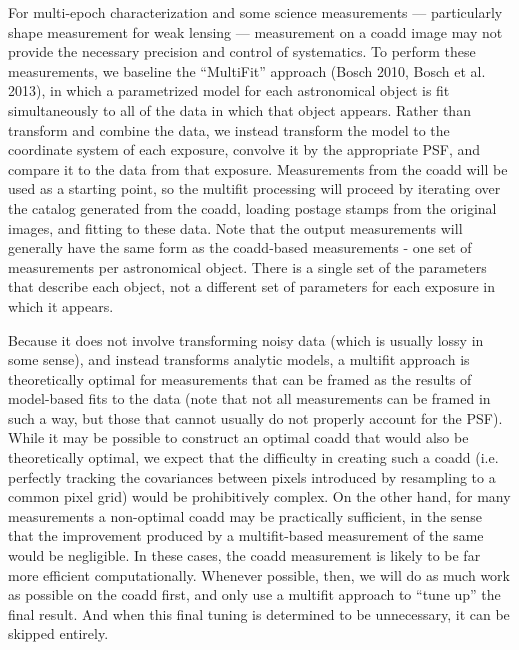 \documentclass[12pt]{article}
\begin{document}
For multi-epoch characterization and some science measurements --- particularly shape measurement for weak
lensing --- measurement on a coadd image may not provide the necessary
precision and control of systematics.  To perform these measurements,
we baseline the ``MultiFit'' approach (Bosch 2010, Bosch et al. 2013), in which a
parametrized model for each astronomical object is fit simultaneously
to all of the data in which that object appears.  Rather than
transform and combine the data, we instead transform the model to the
coordinate system of each exposure, convolve it by the appropriate
PSF, and compare it to the data from that exposure.  Measurements from
the coadd will be used as a starting point, so the multifit processing
will proceed by iterating over the catalog generated from the coadd,
loading postage stamps from the original images, and fitting to these
data.  Note that the output measurements will generally have the same
form as the coadd-based measurements - one set of measurements per
astronomical object. There is a single set of the
parameters that describe each object, not a different set of parameters
for each exposure in which it appears.

Because it does not involve transforming noisy data (which is usually
lossy in some sense), and instead transforms analytic models, a
multifit approach is theoretically optimal for measurements that can
be framed as the results of model-based fits to the data (note that
not all measurements can be framed in such a way, but those that
cannot usually do not properly account for the PSF). %
While it may be
possible to construct an optimal coadd that would also be
theoretically optimal, we expect that the difficulty in creating such
a coadd (i.e. perfectly tracking the covariances between pixels
introduced by resampling to a common pixel grid) would be prohibitively
complex.  On the other hand, for many measurements a non-optimal coadd
may be practically
sufficient, in the sense that the improvement produced by a
multifit-based measurement of the same would be negligible.  In these
cases, the coadd measurement is likely to be far more efficient
computationally.  Whenever possible, then, we will do as much work as
possible on the coadd first, and only use a multifit approach to ``tune up''
the final result.  And when this final tuning is determined to be
unnecessary, it can be skipped entirely.
\end{document}
